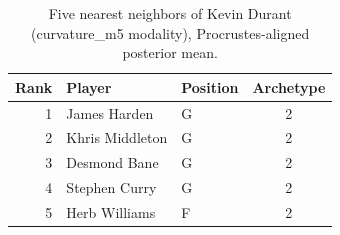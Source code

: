 \begin{table}[htbp]
  \centering\small
  \begin{tabular}{rllc}
    \toprule
    Rank & Player & Position & Archetype \\
    \midrule
    1 & James Harden & G & 2 \\
    2 & Khris Middleton & G & 2 \\
    3 & Desmond Bane & G & 2 \\
    4 & Stephen Curry & G & 2 \\
    5 & Herb Williams & F & 2 \\
    \bottomrule
  \end{tabular}
  \caption{Five nearest neighbors of Kevin Durant (curvature_m5 modality), Procrustes-aligned posterior mean.}
  \label{tab:Kevin_Durant_neighbors_curvature_m5}
\end{table}

